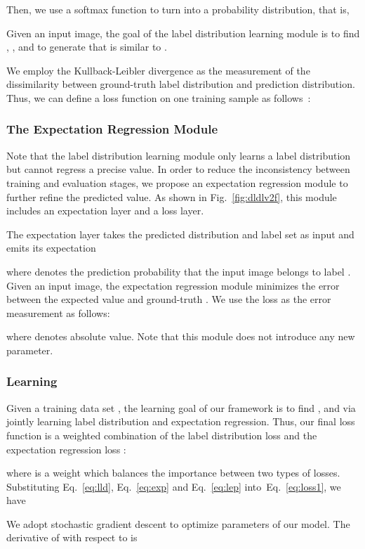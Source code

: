 \documentclass[5p,times,twocolumn]{elsarticle}
\begin{document}
Then, we use a softmax function to turn  into a probability distribution, that is,

Given an input image, the goal of the label distribution learning module is to find , , and  to generate  that is similar to .

We employ the Kullback-Leibler divergence as the measurement of the dissimilarity between ground-truth label distribution and prediction distribution. Thus, we can define a loss function on one training sample as follows~\cite{gao2017deep}:


\subsubsection{The Expectation Regression Module}
Note that the label distribution learning module only learns a label distribution but cannot regress a precise value. In order to reduce the inconsistency between training and evaluation stages, we propose an expectation regression module to further refine the predicted value. As shown in Fig.~\ref{fig:dldlv2f}, this module includes an expectation layer and a loss layer.

The expectation layer takes the predicted distribution and label set as input and emits its expectation 

where  denotes the prediction probability that the input image belongs to label .
Given an input image, the expectation regression module minimizes the error between the expected value  and ground-truth . We use the  loss as the error measurement as follows:

where  denotes absolute value. Note that this module does not introduce any new parameter.

\subsubsection{Learning}
Given a training data set , the learning goal of our framework is to find ,  and  via jointly learning label distribution and expectation regression. Thus, our final loss function is a weighted combination of the label distribution loss  and the expectation regression loss :

where  is a weight which balances the importance between two types of losses.
Substituting Eq.~\eqref{eq:lld}, Eq.~\eqref{eq:exp} and Eq.~\eqref{eq:lep} into~Eq.~\eqref{eq:loss1}, we have


We adopt stochastic gradient descent to optimize parameters of our model. The derivative of  with respect to  is
\end{document}
